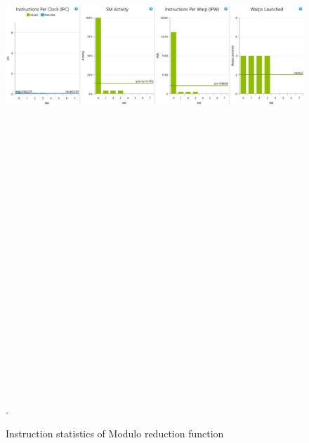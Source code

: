 \documentclass[oneside,openright,12pt,final,en]{mgr}
\begin{document}
\begin{figure}[H]
	\centering
	\includegraphics[width=\textwidth, height=26cm,keepaspectratio]{mod_instructions}.
	\caption{Instruction statistics of Modulo reduction function}
	\label{fig:mod_instructions}
\end{figure}
\end{document}
